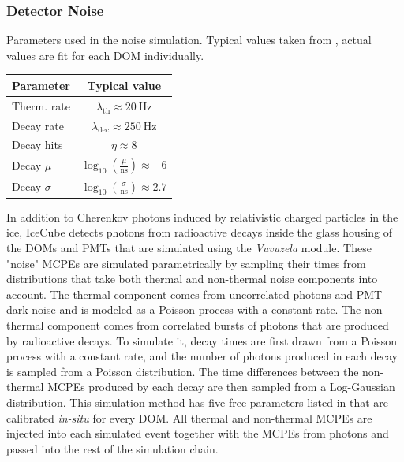 \subsubsection{Detector Noise}

\begin{margintable}
\caption{\label{tab:vuvuzela_params} Parameters used in the noise simulation. Typical values taken from \cite{Michael_Larson_masters}, actual values are fit for each DOM individually.}
    \begin{tabular}{lc}\toprule
        \textbf{Parameter} & \textbf{Typical value} \\ \midrule
        Therm. rate &  $\lambda_\mathrm{th}\approx \SI{20}{\hertz}$ \\
        Decay rate &  $\lambda_\mathrm{dec}\approx \SI{250}{\hertz}$ \\
        Decay hits &  $\eta\approx 8$ \\
        Decay $\mu$ &  $\log_{10}(\frac{\mu}{\si{\nano\second}}) \approx -6$\\
        Decay $\sigma$ &  $\log_{10}(\frac{\sigma}{\si{\nano\second}}) \approx 2.7$ \\ \bottomrule
    \end{tabular}
\end{margintable}
In addition to Cherenkov photons induced by relativistic charged particles in the ice, IceCube detects photons from radioactive decays inside the glass housing of the DOMs and PMTs that are simulated using the \emph{Vuvuzela} module.
These "noise" MCPEs are simulated parametrically by sampling their times from distributions that take both thermal and non-thermal noise components into account. The thermal component comes from uncorrelated photons and PMT dark noise and is modeled as a Poisson process with a constant rate.
The non-thermal component comes from correlated bursts of photons that are produced by radioactive decays.
To simulate it, decay times are first drawn from a Poisson process with a constant rate, and the number of photons produced in each decay is sampled from a Poisson distribution.
The time differences between the non-thermal MCPEs produced by each decay are then sampled from a Log-Gaussian distribution.
This simulation method has five free parameters listed in  that are calibrated \emph{in-situ} for every DOM.
All thermal and non-thermal MCPEs are injected into each simulated event together with the MCPEs from photons and passed into the rest of the simulation chain.
